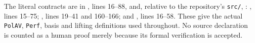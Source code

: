 {The literal contracts are in
,
lines 16--88, and, relative to the repository's \texttt{src/},
:
, lines 15--75;
, lines 19--41 and 160--166;
and , lines 16--58.
These give the actual \texttt{PolAV}, \texttt{Perf}, basis and lifting
definitions used throughout.  No source declaration is counted as a
human proof merely because its formal verification is accepted.
\par}
